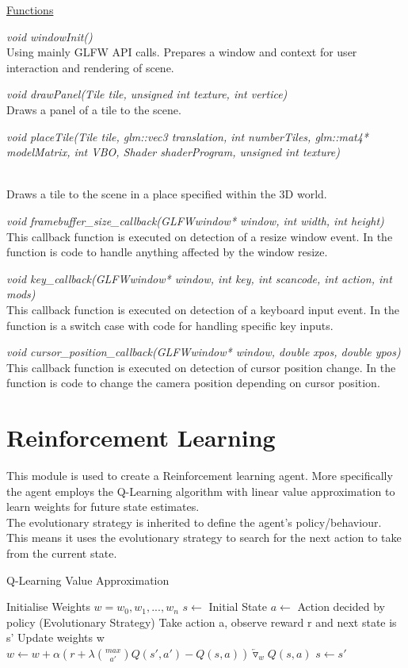 \documentclass{report}
\begin{document}
\noindent\underline{Functions}

\textit{void windowInit()}\\
Using mainly GLFW API calls. Prepares a window and context for user interaction and rendering of scene.

\textit{void drawPanel(Tile tile, unsigned int texture, int vertice)}\\
Draws a panel of a tile to the scene.

\hypertarget{txt:pt}{\textit{void placeTile(Tile tile, glm::vec3 translation, int numberTiles, glm::mat4* modelMatrix, int VBO, Shader shaderProgram, unsigned int texture)}}\\
Draws a tile to the scene in a place specified within the 3D world.

\textit{void framebuffer\_size\_callback(GLFWwindow* window, int width, int height)}\\
This callback function is executed on detection of a resize window event. In the function is code to handle anything affected by the window resize.

\textit{void key\_callback(GLFWwindow* window, int key, int scancode, int action, int mods)}\\
This callback function is executed on detection of a keyboard input event. In the function is a switch case with code for handling specific key inputs.

\textit{void cursor\_position\_callback(GLFWwindow* window, double xpos, double ypos)}\\
This callback function is executed on detection of cursor position change. In the function is code to change the camera position depending on cursor position.

\section{Reinforcement Learning}
This module is used to create a Reinforcement learning agent. More specifically the agent employs the Q-Learning algorithm with linear value approximation to learn weights for future state estimates.\\
The evolutionary strategy is inherited to define the agent's policy/behaviour. This means it uses the evolutionary strategy to search for the next action to take from the current state.

\begin{algorithm}
\caption{Q-Learning Value Approximation}
\label{alg:qlva}
\begin{algorithmic}[1]
\State Initialise Weights $w = {w_0, w_1, ..., w_n}$
\State $s \leftarrow$ Initial State
\State $a \leftarrow$ Action decided by policy (Evolutionary Strategy)
\State Take action a, observe reward r and next state is s'
\State Update weights w
\State $w \leftarrow w + \alpha(r + \lambda \binom{max}{a'} Q(s',a') - Q(s,a)) \overleftarrow{\triangledown}_w Q(s,a)$
\State $s \leftarrow s'$
\EndFor
\end{algorithmic}
\end{algorithm}
\end{document}
